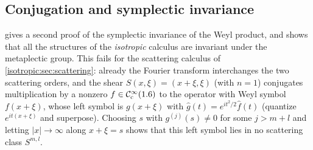 \subsection{Conjugation and symplectic invariance}

 gives a second proof of the symplectic
invariance of the Weyl product, and shows that all the structures of the
\emph{isotropic} calculus are invariant under the metaplectic group. This
fails for the scattering calculus of \cref{isotropic:sec:scattering}: already
the Fourier transform interchanges the two scattering orders, and the shear
$S(x,\xi)=(x+\xi,\xi)$ (with $n=1$) conjugates multiplication by a nonzero
$f\in\mathcal{C}^\infty_{\mathrm{c}}(1.6)$ to the operator with Weyl symbol $f(x+\xi)$, whose left symbol
is $g(x+\xi)$ with $\hat g(t)=e^{it^2/2}\hat f(t)$ (quantize $e^{it(x+\xi)}$ and
superpose). Choosing $s$ with $g^{(j)}(s)\ne0$ for some $j>m+l$ and letting
$|x|\to\infty$ along $x+\xi=s$ shows that this left symbol lies in no
scattering class $S^{m,l}$.

